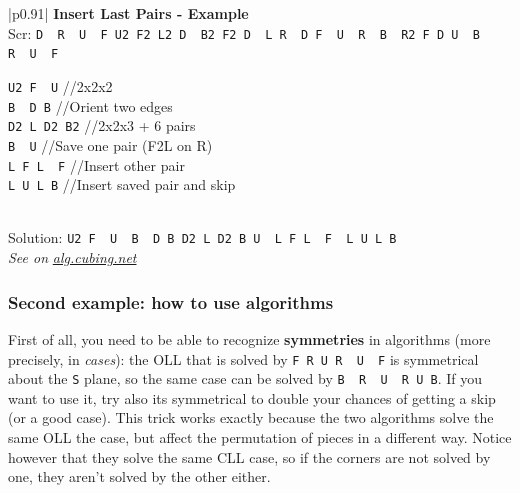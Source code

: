\documentclass[11pt,a4paper]{book}
\newcommand{\p}{\textquotesingle}
\newcommand{\m}{\texttt}
\newcommand{\ps}{\p\,\,}
\newcommand{\comment}[1]{{\color{gray}\quad//#1}}
\begin{document}
\bigskip
\begin{tabular}{|p{}|}
\hline
\textbf{Insert Last Pairs - Example}\\
\hline
Scr: \m{D\ps R\ps U\ps F U2 F2 L2 D\ps B2 F2 D\ps L R\ps D F\ps U\ps R\ps B\ps R2 F D U\ps B\ps R\ps U\ps F }\\
\hline
\begin{minipage}[l]{0.650\textwidth}
\m{U2 F\ps U\p} \comment{2x2x2}\\
\m{B\ps D B} \comment{Orient two edges}\\
\m{D2 L D2 B2} \comment{2x2x3 + 6 pairs}\\
\m{B\ps U\p} \comment{Save one pair (F2L on R)}\\
\m{L F L\ps F\p} \comment{Insert other pair}\\
\m{L U L B} \comment{Insert saved pair and skip}
\end{minipage}
\begin{minipage}[c]{0.25\textwidth}

\end{minipage}\\
\hline
Solution: \m{U2 F\ps U\ps B\ps D B D2 L D2 B U\ps L F L\ps F\ps L U L B}\\
\hline
\emph{See on }\href{https://alg.cubing.net/?setup=D-_R-_U-_F_U2_F2_L2_D-_B2_F2_D-_L_R-_D_F-_U-_R-_B-_R2_F_D_U-_B-_R-_U-_F&alg=U2_F-_U-_\%2F\%2F2x2x2\%0AB-_D_B_\%2F\%2FOrient_two_edges\%0AD2_L_D2_B2_\%2F\%2F2x2x3_\%26\%232b\%3B_6_pairs\%0AB-_U-\%2F\%2FSave_one_pair_(for_F2L_on_R)\%0AL_F_L-_F-_\%2F\%2FInsert_other_pair\%0AL_U_L_B_\%2F\%2FInsert_saved_pair_and_skip}{\emph{alg.cubing.net}}\\
\hline
\end{tabular}
\bigskip

\subsubsection{Second example: how to use algorithms}

First of all, you need to be able to recognize \textbf{symmetries} in algorithms (more precisely, in \emph{cases}): the OLL that is solved by \m{F R U R\ps U\ps F\p} is symmetrical about the \m S plane, so the same case can be solved by \m{B\ps R\ps U\ps R U B}. If you want to use it, try also its symmetrical to double your chances of getting a skip (or a good case). This trick works exactly because the two algorithms solve the same OLL the case, but affect the permutation of pieces in a different way. Notice however that they solve the same CLL case, so if the corners are not solved by one, they aren't solved by the other either.
\end{document}
